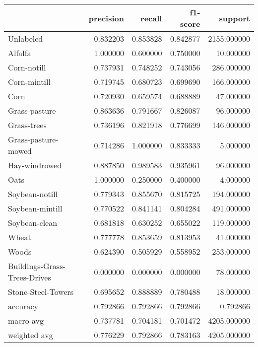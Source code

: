 \begin{tabular}{lrrrr}
\toprule
{} &  precision &    recall &  f1-score &      support \\
\midrule
Unlabeled                    &   0.832203 &  0.853828 &  0.842877 &  2155.000000 \\
Alfalfa                      &   1.000000 &  0.600000 &  0.750000 &    10.000000 \\
Corn-notill                  &   0.737931 &  0.748252 &  0.743056 &   286.000000 \\
Corn-mintill                 &   0.719745 &  0.680723 &  0.699690 &   166.000000 \\
Corn                         &   0.720930 &  0.659574 &  0.688889 &    47.000000 \\
Grass-pasture                &   0.863636 &  0.791667 &  0.826087 &    96.000000 \\
Grass-trees                  &   0.736196 &  0.821918 &  0.776699 &   146.000000 \\
Grass-pasture-mowed          &   0.714286 &  1.000000 &  0.833333 &     5.000000 \\
Hay-windrowed                &   0.887850 &  0.989583 &  0.935961 &    96.000000 \\
Oats                         &   1.000000 &  0.250000 &  0.400000 &     4.000000 \\
Soybean-notill               &   0.779343 &  0.855670 &  0.815725 &   194.000000 \\
Soybean-mintill              &   0.770522 &  0.841141 &  0.804284 &   491.000000 \\
Soybean-clean                &   0.681818 &  0.630252 &  0.655022 &   119.000000 \\
Wheat                        &   0.777778 &  0.853659 &  0.813953 &    41.000000 \\
Woods                        &   0.624390 &  0.505929 &  0.558952 &   253.000000 \\
Buildings-Grass-Trees-Drives &   0.000000 &  0.000000 &  0.000000 &    78.000000 \\
Stone-Steel-Towers           &   0.695652 &  0.888889 &  0.780488 &    18.000000 \\
accuracy                     &   0.792866 &  0.792866 &  0.792866 &     0.792866 \\
macro avg                    &   0.737781 &  0.704181 &  0.701472 &  4205.000000 \\
weighted avg                 &   0.776229 &  0.792866 &  0.783163 &  4205.000000 \\
\bottomrule
\end{tabular}

